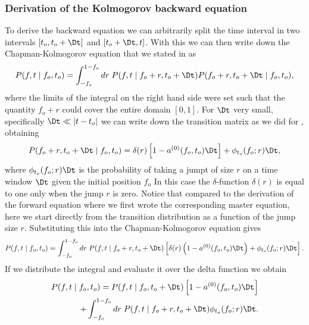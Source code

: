 \subsubsection{Derivation of the Kolmogorov backward equation}

To derive the backward equation we can arbitrarily split the time interval in
two intervals $[t_o, t_o + \Dt]$ and $[t_o + \Dt, t]$. With this we can then
write down the Chapman-Kolmogorov equation that we stated in
 as
\begin{equation}
  P(f, t \mid f_o, t_o) = \int_{-f_o}^{1 - f_o} dr \;
  P(f, t \mid f_o + r, t_o + \Dt)
  P(f_o + r, t_o + \Dt \mid f_o, t_o),
\end{equation}
where the limits of the integral on the right hand side were set such that the
quantity $f_o + r$ could cover the entire domain $[0, 1]$. For $\Dt$ very
small, specifically $\Dt \ll |t - t_o|$ we can write down the transition matrix
as we did for , obtaining
\begin{equation}
	P(f_o + r, t_o + \Dt \mid f_o, t_o) =
	\delta(r) \left[
	1 - a^{(0)}(f_o, t_o) \Dt
	\right] +
	\phi_{t_o}(f_o; r) \Dt,
\end{equation}
where $\phi_{t_o}(f_o; r) \Dt$ is the probability of taking a jumpt of size $r$
on a time window $\Dt$ given the initial position $f_o$ In this case the
$\delta$-function $\delta(r)$ is equal to one only when the jump $r$ is zero.
Notice that compared to the derivation of the forward equation where we first
wrote the corresponding master equation, here we start directly from the
transition distribution as a function of the jump size $r$. Substituting this
into the Chapman-Kolmogorov equation gives
\begin{equation}
	P(f, t \mid f_o, t_o) = \int_{-f_o}^{1 - f_o} dr\;
	P(f, t \mid f_o + r, t_o + \Dt)
	\left[
	\delta(r) \left( 1 - a^{(0)}(f_o, t_o) \Dt \right) +
	\phi_{t_o}(f_o; r) \Dt
	\right].
\end{equation}
If we distribute the integral and evaluate it over the delta function we obtain
\begin{equation}
	\begin{split}
		P(f, t \mid f_o, t_o) = P(f, t \mid f_o, t_o + \Dt)
		\left[
		1 - a^{(0)}(f_o, t_o)\Dt
		\right]\\ +
		\int_{-f_o}^{1 - f_o} dr\; P(f, t \mid f_o + r, t_o + \Dt)
		\phi_{t_o}(f_o; r) \Dt.
	\end{split}
	\label{eq_chap_kol_delta_eval_backwards}
\end{equation}
